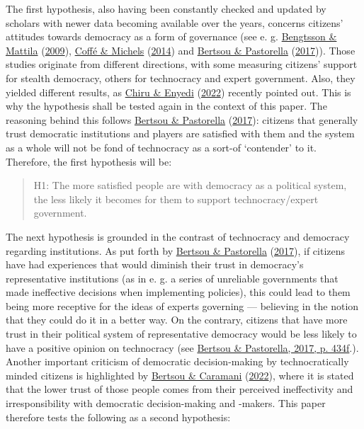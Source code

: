 \documentclass[
  12pt,
  english,
]{article}
\begin{document}
The first hypothesis, also having been constantly checked and updated by
scholars with newer data becoming available over the years, concerns
citizens' attitudes towards democracy as a form of governance (see e. g.
\protect\hyperlink{ref-bengtsson2009direct}{Bengtsson \& Mattila}
(\protect\hyperlink{ref-bengtsson2009direct}{2009}),
\protect\hyperlink{ref-coffe2014education}{Coffé \& Michels}
(\protect\hyperlink{ref-coffe2014education}{2014}) and
\protect\hyperlink{ref-bertsou2017technocratic}{Bertsou \& Pastorella}
(\protect\hyperlink{ref-bertsou2017technocratic}{2017})). Those studies
originate from different directions, with some measuring citizens'
support for stealth democracy, others for technocracy and expert
government. Also, they yielded different results, as
\protect\hyperlink{ref-chiru2022wants}{Chiru \& Enyedi}
(\protect\hyperlink{ref-chiru2022wants}{2022}) recently pointed out.
This is why the hypothesis shall be tested again in the context of this
paper. The reasoning behind this follows
\protect\hyperlink{ref-bertsou2017technocratic}{Bertsou \& Pastorella}
(\protect\hyperlink{ref-bertsou2017technocratic}{2017}): citizens that
generally trust democratic institutions and players are satisfied with
them and the system as a whole will not be fond of technocracy as a
sort-of `contender' to it. Therefore, the first hypothesis will be:

\begin{quote}
H1: The more satisfied people are with democracy as a political system,
the less likely it becomes for them to support technocracy/expert
government.
\end{quote}

The next hypothesis is grounded in the contrast of technocracy and
democracy regarding institutions. As put forth by
\protect\hyperlink{ref-bertsou2017technocratic}{Bertsou \& Pastorella}
(\protect\hyperlink{ref-bertsou2017technocratic}{2017}), if citizens
have had experiences that would diminish their trust in democracy's
representative institutions (as in e. g. a series of unreliable
governments that made ineffective decisions when implementing policies),
this could lead to them being more receptive for the ideas of experts
governing --- believing in the notion that they could do it in a better
way. On the contrary, citizens that have more trust in their political
system of representative democracy would be less likely to have a
positive opinion on technocracy (see
\protect\hyperlink{ref-bertsou2017technocratic}{Bertsou \& Pastorella,
2017, p. 434f}.). Another important criticism of democratic
decision-making by technocratically minded citizens is highlighted by
\protect\hyperlink{ref-bertsou2022people}{Bertsou \& Caramani}
(\protect\hyperlink{ref-bertsou2022people}{2022}), where it is stated
that the lower trust of those people comes from their perceived
ineffectivity and irresponsibility with democratic decision-making and
-makers. This paper therefore tests the following as a second
hypothesis:
\end{document}
